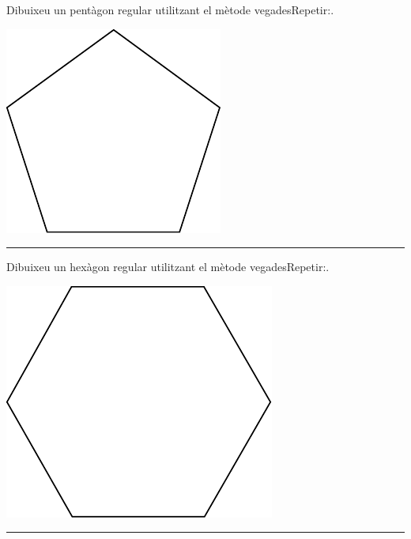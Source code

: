 \newpage

\begin{center}
\colorbox{black}{}
\end{center}
{\small
\noindent
Dibuixeu un pentàgon regular utilitzant el mètode \textsf{vegadesRepetir:}.}
\begin{center}
\includegraphics[scale=0.7]{Imatges/figuraE7-3.pdf} 
\end{center}
\noindent
\rule{\textwidth}{3pt}

\begin{center}
\colorbox{black}{}
\end{center}
{\small
\noindent
Dibuixeu un hexàgon regular utilitzant el mètode \textsf{vegadesRepetir:}.}
\begin{center}
\includegraphics[scale=0.6]{Imatges/figuraE7-4.pdf} 
\end{center}
\noindent
\rule{\textwidth}{3pt}

